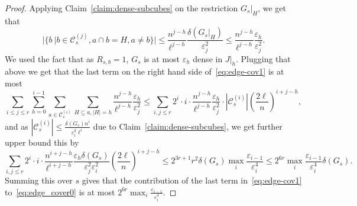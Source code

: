 \documentclass[11pt]{article}
\DeclareMathOperator*{\Ind}{\mathbb{I}}
\def \cC {\mathcal{C}}
\def \eps {{\varepsilon}}
\theoremstyle{definition}
\begin{document}
\begin{proof}
Applying Claim~\ref{claim:dense-subcubes} on the 
restriction $G_s|_H$, we get that 
\[
|\{b~|b\in \cC^{(j)}_s, a\cap b = H, a\neq b\}|
\leq \frac{n^{j-h}}{\ell^{j-h}}\frac{\delta(G_s|_H)}{\eps_{j}^2}
\leq \frac{n^{j-h}}{\ell^{j-h}}\frac{\eps_h}{\eps_{j}^2}.
\]
We used the fact that as $R_{s,b} = 1$,  $G_s$ is at most $\eps_h$ dense in $J|_h$. Plugging that above we get that the last term 
on the right hand side of~\eqref{eq:edge-cov1} is 
at most
\[
\sum_{i\leq j \leq r} 
\sum\limits_{h=0}^{i-1}
\sum_{a \in \cC^{(i)}_s}
\sum_{H\subseteq a, |H| = h}
\frac{n^{j-h}}{\ell^{j-h}}\frac{\eps_h}{\eps_{j}^2}
\leq 
\sum_{i, j \leq r} 
2^i \cdot i\cdot \frac{n^{j-h}}{\ell^{j-h}}\frac{\eps_h}{\eps_{j}^2}
\cdot |\cC^{(i)}_s|\left(\frac{2\ell}{n}\right)^{i+j-h},
\]
and as $|\cC^{(i)}_s|\leq \frac{\delta(G_s)n^i}{\eps_i^2\ell^i}$ due to 
Claim~\ref{claim:dense-subcubes}, we get further upper
bound this by
\[
\sum_{i, j \leq r} 
2^i \cdot i\cdot \frac{n^{i+j-h}}{\ell^{i+j-h}}\frac{\eps_h\delta(G_s)}{\eps_{j}^2\eps_i^2}
\left(\frac{2\ell}{n}\right)^{i+j-h}
\leq
2^{3r+1} r^2\delta(G_s) \max_{i}\frac{\eps_{i-1}}{\eps_i^4}
\leq 2^{6r}\max_{i}\frac{\eps_{i-1}}{\eps_i^4}\delta(G_s).
\]
Summing this over $s$ gives that the contribution of the last term in~\eqref{eq:edge-cov1} to~\eqref{eq:edge_cover0} is at most
$2^{6r}\max_{i}\frac{\eps_{i-1}}{\eps_i^4}$.






\end{proof}
\end{document}
